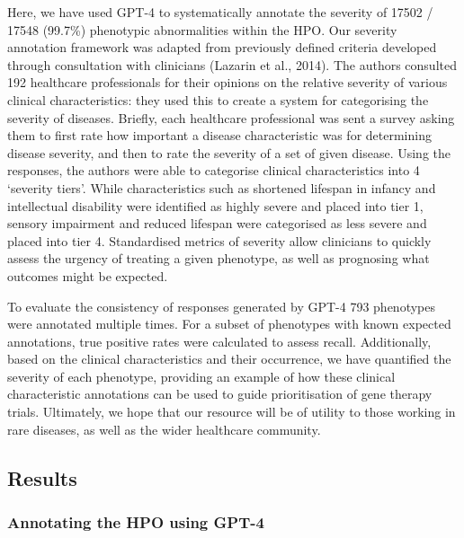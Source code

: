 \documentclass[
]{agujournal2019}
\begin{document}
Here, we have used GPT-4 to systematically annotate the severity of
17502 / 17548 (99.7\%) phenotypic abnormalities within the HPO. Our
severity annotation framework was adapted from previously defined
criteria developed through consultation with clinicians (Lazarin et al.,
2014). The authors consulted 192 healthcare professionals for their
opinions on the relative severity of various clinical characteristics:
they used this to create a system for categorising the severity of
diseases. Briefly, each healthcare professional was sent a survey asking
them to first rate how important a disease characteristic was for
determining disease severity, and then to rate the severity of a set of
given disease. Using the responses, the authors were able to categorise
clinical characteristics into 4 `severity tiers'. While characteristics
such as shortened lifespan in infancy and intellectual disability were
identified as highly severe and placed into tier 1, sensory impairment
and reduced lifespan were categorised as less severe and placed into
tier 4. Standardised metrics of severity allow clinicians to quickly
assess the urgency of treating a given phenotype, as well as prognosing
what outcomes might be expected.

To evaluate the consistency of responses generated by GPT-4 793
phenotypes were annotated multiple times. For a subset of phenotypes
with known expected annotations, true positive rates were calculated to
assess recall. Additionally, based on the clinical characteristics and
their occurrence, we have quantified the severity of each phenotype,
providing an example of how these clinical characteristic annotations
can be used to guide prioritisation of gene therapy trials. Ultimately,
we hope that our resource will be of utility to those working in rare
diseases, as well as the wider healthcare community.

\subsection{Results}\label{results}

\subsubsection{Annotating the HPO using
GPT-4}\label{annotating-the-hpo-using-gpt-4}
\end{document}
